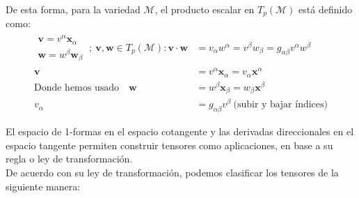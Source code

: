 De esta forma, para la variedad $\mathcal{M}$, el producto escalar en $T_p(\mathcal{M})$ está definido como:
\begin{equation*}
    \begin{split}
        \begin{array}{c}
             \mathbf{v}=v^\alpha \mathbf{x}_\alpha   \\
             \mathbf{w}=w^\beta \mathbf{w}_\beta
        \end{array} \ ; \ \mathbf{v},\mathbf{w}\in T_p(\mathcal{M}):\mathbf{v}\cdot \mathbf{w}&=v_\alpha w^\alpha =v^\beta w_\beta =g_{\alpha \beta }v^\alpha w^\beta\\
        \mathbf{v}&=v^\alpha \mathbf{x}_\alpha =v_\alpha \mathbf{x}^\alpha \\
      \text{Donde hemos usado}\quad   \mathbf{w}&=w^\beta \mathbf{x}_\beta =w_\beta \mathbf{x}^\beta \\
        v_\alpha &=g_{\alpha \beta }v^\beta \ \text{(subir y bajar índices)}
    \end{split}
\end{equation*}

El espacio de 1-formas en el espacio cotangente y las derivadas direccionales en el espacio tangente permiten construir tensores como aplicaciones, en base a su regla o ley de transformación. \\
De acuerdo con su ley de transformación, podemos clasificar los tensores de la siguiente manera:

